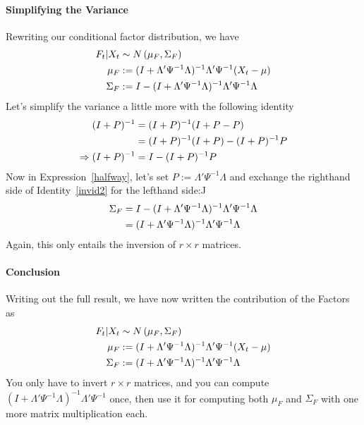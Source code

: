 \documentclass[12pt]{article}
\theoremstyle{plain}
\theoremstyle{definition}
\theoremstyle{remark}
\begin{document}
\paragraph{Simplifying the Variance}
Rewriting our conditional factor distribution, we have
\begin{align}
  F_t|X_t &\sim N\left(\mu_F, \Sigma_F\right) \notag\\
  \mu_F &:=
    (I+\Lambda'\Psi^{-1}\Lambda)^{-1} \Lambda'\Psi^{-1} (X_t-\mu)\notag\\
  \Sigma_F &:=
    I- (I+\Lambda'\Psi^{-1}\Lambda)^{-1} \Lambda'\Psi^{-1}\Lambda
    \label{halfway}
\end{align}
Let's simplify the variance a little more with the following identity
\begin{align}
  (I+P)^{-1}
    &= (I+P)^{-1} ( I + P - P)\notag\\
    &= (I+P)^{-1} ( I + P) - (I+P)^{-1}P\notag\\
  \Rightarrow (I+P)^{-1}
  &= I - (I+P)^{-1}P\label{invid2}
\end{align}
Now in Expression~\ref{halfway}, let's set
$P:=\Lambda'\Psi^{-1}\Lambda$ and exchange the righthand side of
Identity~\ref{invid2} for the lefthand side:J
\begin{align}
  \Sigma_F &=
    I- (I+\Lambda'\Psi^{-1}\Lambda)^{-1} \Lambda'\Psi^{-1}\Lambda\notag\\
  &= (I+\Lambda'\Psi^{-1}\Lambda)^{-1} \Lambda'\Psi^{-1}\Lambda
  \notag
\end{align}
Again, this only entails the inversion of $r\times r$ matrices.

\paragraph{Conclusion} Writing out the full result, we have now written
the contribution of the Factors as
\begin{align}
  F_t|X_t &\sim N\left(\mu_F, \Sigma_F\right) \notag\\
  \mu_F &:=
    (I+\Lambda'\Psi^{-1}\Lambda)^{-1} \Lambda'\Psi^{-1} (X_t-\mu)\notag\\
  \Sigma_F &:=
    (I+\Lambda'\Psi^{-1}\Lambda)^{-1} \Lambda'\Psi^{-1}\Lambda\notag
\end{align}
You only have to invert $r\times r$ matrices, and you can compute
$(I+\Lambda'\Psi^{-1}\Lambda)^{-1} \Lambda'\Psi^{-1}$ once, then use it
for computing both $\mu_F$ and $\Sigma_F$ with one more matrix
multiplication each.
\end{document}
